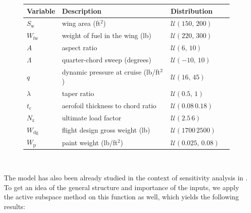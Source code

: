\documentclass[
  a4paper,  %
  twoside,  %
  bibliography=totoc,
  headsepline,
  cleardoublepage=empty,
  parskip=half,
  draft=false
]{scrbook}
\begin{document}
\begin{mdframed}[style=style]
\begin{figure}[H]
\centering
\bgroup
\def\arraystretch{1.2}%
  \begin{tabular}{ l l l l}
Variable & Description & Distribution\\
\hline
$S_{\mathrm{w}}$ & wing area (ft$^2$) & $\mathcal{U}(150,\, 200)$\\
$W_{\mathrm{fw}}$ & weight of fuel in the wing (lb) & $\mathcal{U}(220,\, 300)$\\
$A$ & aspect ratio & $\mathcal{U}(6,\, 10)$\\
$\Lambda$ & quarter-chord sweep (degrees) & $\mathcal{U}(-10 ,\,  10)$\\
$q$ & dynamic pressure at cruise (lb/ft$^2$) & $\mathcal{U}(16,\, 45)$\\
$\lambda$ & taper ratio & $\mathcal{U}(0.5, \, 1)$\\
$t_\mathrm{c}$ & aerofoil thickness to chord ratio & $\mathcal{U}(0.08\, 0.18)$\\
$N_\mathrm{z}$ & ultimate load factor & $\mathcal{U}(2.5\, 6)$\\
$W_\mathrm{dg}$ & flight design gross weight (lb)& $\mathcal{U}(1700\, 2500)$\\
$W_\mathrm{p}$ & paint weight (lb/ft$^2$) & $\mathcal{U}(0.025,\, 0.08)$\\
\end{tabular}
\egroup\\
\vspace{0.5em}
\delimit
{}
\label{tab:ww_params}
\end{figure}
\end{mdframed}
%
The model has also been already studied in the context of sensitivity analysis in \cite{Moon2012}.
To get an idea of the general structure and importance of the inputs, we apply the active subspace method on this function as well, which yields the following results:
\end{document}
